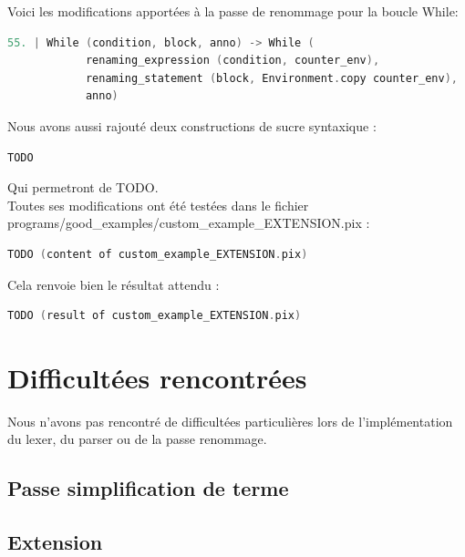 \documentclass{report}
\begin{document}
    Voici les modifications apportées à la passe de renommage pour la boucle While: \\

    \begin{lstlisting}[language=C, basicstyle=\ttfamily]
        55. | While (condition, block, anno) -> While (
            renaming_expression (condition, counter_env),
            renaming_statement (block, Environment.copy counter_env),
            anno)
    \end{lstlisting}

    Nous avons aussi rajouté deux constructions de sucre syntaxique :\\

    \begin{lstlisting}[language=C, basicstyle=\ttfamily]
        TODO
    \end{lstlisting}

    Qui permetront de TODO.\\

    Toutes ses modifications ont été testées dans le fichier programs/good\_examples/custom\_example\_EXTENSION.pix :\\

    \begin{lstlisting}[language=C, basicstyle=\ttfamily]
        TODO (content of custom_example_EXTENSION.pix)
    \end{lstlisting}

    Cela renvoie bien le résultat attendu : \\

    \begin{lstlisting}[language=C, basicstyle=\ttfamily]
        TODO (result of custom_example_EXTENSION.pix)
    \end{lstlisting}

    \newpage

\chapter{Difficultées rencontrées}

   \quad Nous n'avons pas rencontré de difficultées particulières lors de l'implémentation du lexer, du parser ou de la passe renommage.\\

    \section{Passe simplification de terme}

    \section{Extension}
\end{document}
